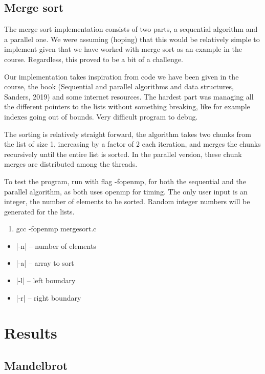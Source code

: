 \documentclass[12pt,a4paper,oneside,article]{memoir}
\numberwithin{equation}{chapter}
\begin{document}
\section{Merge sort}
The merge sort implementation consists of two parts, a sequential algorithm and a parallel one. We were assuming (hoping) that this would be relatively simple to implement given that we have worked with merge sort as an example in the course. Regardless, this proved to be a bit of a challenge.  

Our implementation takes inspiration from code we have been given in the course, the book (Sequential and parallel algorithms and data structures, Sanders, 2019) and some internet resources. The hardest part was managing all the different pointers to the lists without something breaking, like for example indexes going out of bounds. Very difficult program to debug.  

The sorting is relatively straight forward, the algorithm takes two chunks from the list of size 1, increasing by a factor of 2 each iteration, and merges the chunks recursively until the entire list is sorted. In the parallel version, these chunk merges are distributed among the threads.  

To test the program, run with flag -fopenmp, for both the sequential and the parallel algorithm, as both uses openmp for timing. The only user input is an integer, the number of elements to be sorted. Random integer numbers will be generated for the lists.

\begin{enumerate}
  \item gcc -fopenmp mergesort.c
\end{enumerate}

\begin{itemize}
  \item |-n| -- number of elements
  \item |-a| -- array to sort
  \item |-l| -- left boundary
  \item |-r| -- right boundary
\end{itemize}

\clearpage

\chapter{Results} %
\label{cha:Results}

\section{Mandelbrot} %
\label{sec:Mandelbrot}
\end{document}
